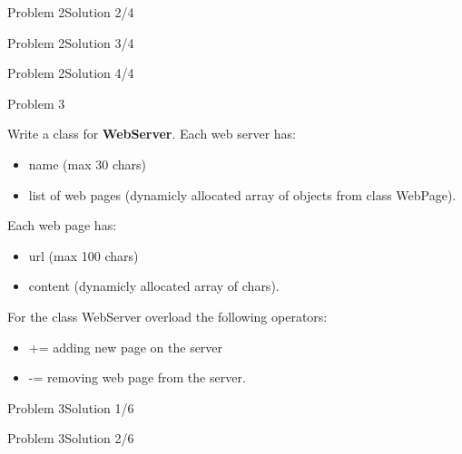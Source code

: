 \begin{frame}[fragile]{Problem 2}{Solution 2/4}

\end{frame}

\begin{frame}[fragile]{Problem 2}{Solution 3/4}

\end{frame}

\begin{frame}[fragile]{Problem 2}{Solution 4/4}

\end{frame}

\begin{frame}{Problem 3}
\begin{scriptsize}
Write a class for \textbf{WebServer}. Each web server has:
\begin{itemize}
  \item name (max 30 chars)
  \item list of web pages (dynamicly allocated array of objects from class
  WebPage).
\end{itemize}

Each web page has:

\begin{itemize}
  \item url (max 100 chars)
  \item content (dynamicly allocated array of chars).
\end{itemize}

For the class WebServer overload the following operators:

\begin{itemize}
  \item += adding new page on the server
  \item -= removing web page from the server.
\end{itemize}

\end{scriptsize}
\end{frame}

\begin{frame}[fragile]{Problem 3}{Solution 1/6}

\end{frame}

\begin{frame}[fragile]{Problem 3}{Solution 2/6}

\end{frame}

